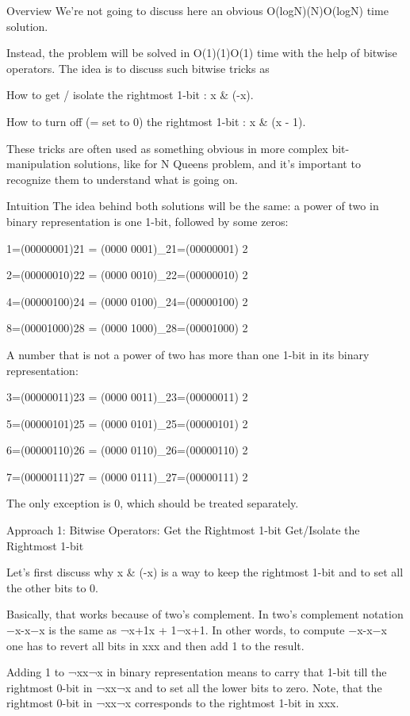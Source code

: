 Overview
We're not going to discuss here an obvious O(log⁡N)(\log N)O(logN) time solution.


Instead, the problem will be solved in O(1)(1)O(1) time with the help of bitwise operators. The idea is to discuss such bitwise tricks as

How to get / isolate the rightmost 1-bit : x & (-x).

How to turn off (= set to 0) the rightmost 1-bit : x & (x - 1).

These tricks are often used as something obvious in more complex bit-manipulation solutions, like for N Queens problem, and it's important to recognize them to understand what is going on.




Intuition
The idea behind both solutions will be the same: a power of two in binary representation is one 1-bit, followed by some zeros:

1=(00000001)21 = (0000 0001)_21=(00000001) 
2
​
 

2=(00000010)22 = (0000 0010)_22=(00000010) 
2
​
 

4=(00000100)24 = (0000 0100)_24=(00000100) 
2
​
 

8=(00001000)28 = (0000 1000)_28=(00001000) 
2
​
 

A number that is not a power of two has more than one 1-bit in its binary representation:

3=(00000011)23 = (0000 0011)_23=(00000011) 
2
​
 

5=(00000101)25 = (0000 0101)_25=(00000101) 
2
​
 

6=(00000110)26 = (0000 0110)_26=(00000110) 
2
​
 

7=(00000111)27 = (0000 0111)_27=(00000111) 
2
​
 

The only exception is 0, which should be treated separately.




Approach 1: Bitwise Operators: Get the Rightmost 1-bit
Get/Isolate the Rightmost 1-bit

Let's first discuss why x & (-x) is a way to keep the rightmost 1-bit and to set all the other bits to 0.

Basically, that works because of two's complement. In two's complement notation −x-x−x is the same as ¬x+1\lnot x + 1¬x+1. In other words, to compute −x-x−x one has to revert all bits in xxx and then add 1 to the result.

Adding 1 to ¬x\lnot x¬x in binary representation means to carry that 1-bit till the rightmost 0-bit in ¬x\lnot x¬x and to set all the lower bits to zero. Note, that the rightmost 0-bit in ¬x\lnot x¬x corresponds to the rightmost 1-bit in xxx.

